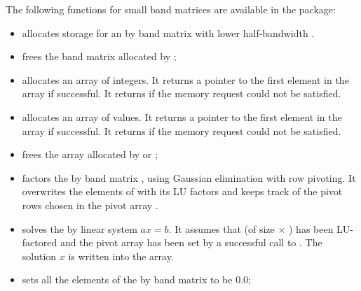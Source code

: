 The following functions for small band matrices are available in the
{\band} package:
\begin{itemize}

\item {}
  \par {} allocates storage for an  by 
  band matrix with lower half-bandwidth .

\item {}
  \par {} frees the band matrix  allocated by ;

\item {}
  \par {} allocates an array of  integers. 
  It returns a pointer to the first element in the array if successful. 
  It returns  if the memory request could not be satisfied.

\item {}
  \par {} allocates an array of   values. 
  It returns a pointer to the first element in the array if successful. 
  It returns  if the memory request could not be satisfied.

\item {}
  \par {} frees the array  allocated by  or ;

\item {}
  \par {} factors the  by  band matrix ,
  using Gaussian elimination with row pivoting. 
  It overwrites the elements of  with its LU factors and keeps track of the
  pivot rows chosen in the pivot array .

\item {}
  \par {} solves the  by  linear system $ax = b$. 
  It assumes that  (of size  $\times$ ) has been LU-factored 
  and the pivot array  has been set by a successful call to 
  . The solution $x$ is written into the  array.

\item {}
  \par {} sets all the elements of the  by  band matrix
   to be $0.0$;


\end{itemize}
